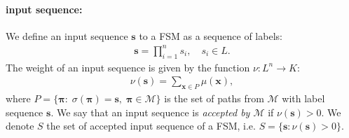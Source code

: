 \paragraph{input sequence:} We define an input sequence $\mathbf{s}$ to
a FSM as a sequence of labels:
\begin{align}
    \mathbf{s} = \prod_{i=1}^n s_i, \quad s_i \in L.
\end{align}
The weight of an input sequence is given by the function
$\nu: L^n \rightarrow K$:
\begin{align}
    \nu(\mathbf{s}) = \sum_{ \mathbf{x} \in P} \mu(\mathbf{x}),
\end{align}
where $P = \{\boldsymbol{\pi} : \; \sigma(\boldsymbol{\pi}) = \mathbf{s}, \;
\boldsymbol{\pi} \in \mathcal{M} \}$ is the set of paths from
$\mathcal{M}$ with label sequence $\mathbf{s}$.
We say that an input sequence is \emph{accepted by $\mathcal{M}$} if
$\nu(\mathbf{s}) > 0$. We denote $S$ the set of accepted input sequence
of a FSM, i.e. $S = \{\mathbf{s} : \nu(\mathbf{s}) > 0 \}$.




